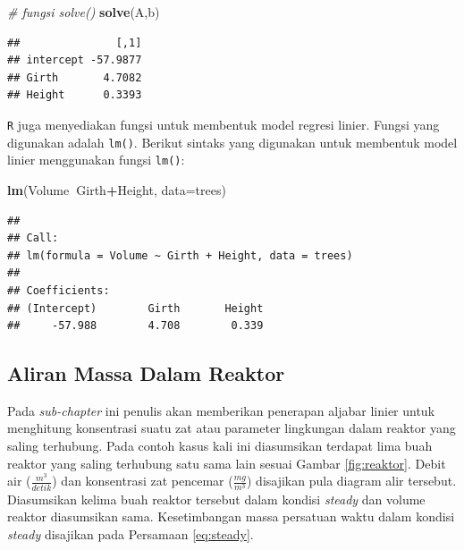 \documentclass[]{book}
\newenvironment{Shaded}{\begin{snugshade}}{\end{snugshade}}
\newcommand{\CommentTok}[1]{\textcolor[rgb]{0.56,0.35,0.01}{\textit{#1}}}
\newcommand{\DataTypeTok}[1]{\textcolor[rgb]{0.13,0.29,0.53}{#1}}
\newcommand{\KeywordTok}[1]{\textcolor[rgb]{0.13,0.29,0.53}{\textbf{#1}}}
\newcommand{\NormalTok}[1]{#1}
\newcommand{\OperatorTok}[1]{\textcolor[rgb]{0.81,0.36,0.00}{\textbf{#1}}}
\theoremstyle{definition}
\theoremstyle{definition}
\theoremstyle{definition}
\theoremstyle{remark}
\begin{document}
\begin{Shaded}
\begin{Highlighting}[]
\CommentTok{# fungsi solve()}
\KeywordTok{solve}\NormalTok{(A,b)}
\end{Highlighting}
\end{Shaded}

\begin{verbatim}
##               [,1]
## intercept -57.9877
## Girth       4.7082
## Height      0.3393
\end{verbatim}

\texttt{R} juga menyediakan fungsi untuk membentuk model regresi linier. Fungsi yang digunakan adalah \texttt{lm()}. Berikut sintaks yang digunakan untuk membentuk model linier menggunakan fungsi \texttt{lm()}:

\begin{Shaded}
\begin{Highlighting}[]
\KeywordTok{lm}\NormalTok{(Volume}\OperatorTok{~}\NormalTok{Girth}\OperatorTok{+}\NormalTok{Height, }\DataTypeTok{data=}\NormalTok{trees)}
\end{Highlighting}
\end{Shaded}

\begin{verbatim}
## 
## Call:
## lm(formula = Volume ~ Girth + Height, data = trees)
## 
## Coefficients:
## (Intercept)        Girth       Height  
##     -57.988        4.708        0.339
\end{verbatim}

\hypertarget{reaktorkimia}{%
\subsection{Aliran Massa Dalam Reaktor}\label{reaktorkimia}}

Pada \emph{sub-chapter} ini penulis akan memberikan penerapan aljabar linier untuk menghitung konsentrasi suatu zat atau parameter lingkungan dalam reaktor yang saling terhubung. Pada contoh kasus kali ini diasumsikan terdapat lima buah reaktor yang saling terhubung satu sama lain sesuai Gambar \ref{fig:reaktor}. Debit air (\(\frac{m^{3}}{detik}\)) dan konsentrasi zat pencemar (\(\frac{mg}{m^3}\)) disajikan pula diagram alir tersebut. Diasumsikan kelima buah reaktor tersebut dalam kondisi \emph{steady} dan volume reaktor diasumsikan sama. Kesetimbangan massa persatuan waktu dalam kondisi \emph{steady} disajikan pada Persamaan \eqref{eq:steady}.
\end{document}
